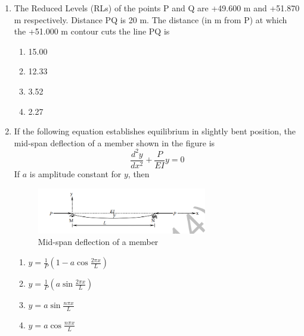 \documentclass[journal,12pt,onecolumn]{IEEEtran}
\theoremstyle{remark}
\begin{document}
\begin{enumerate}
The TRUE statement(s) is(are) \hfill{}

\begin{multicols}{4}
\begin{enumerate}
\item P only
\item Q only
\item P and Q only
\item P and R only
\end{enumerate}
\end{multicols}

\item The Reduced Levels (RLs) of the points P and Q are +49.600 m and +51.870 m respectively. Distance PQ is 20 m. The distance (in m from P) at which the +51.000 m contour cuts the line PQ is \hfill{}

\begin{multicols}{4}
\begin{enumerate}
\item 15.00
\item 12.33
\item 3.52
\item 2.27
\end{enumerate}
\end{multicols}



\item If the following equation establishes equilibrium in slightly bent position, the mid-span deflection of a member shown in the figure is
\[
\frac{d^2 y}{dx^2} + \frac{P}{EI} y = 0
\]
If \(a\) is amplitude constant for \(y\), then \hfill{}

\begin{figure}[H]
    \centering
    \includegraphics[width=0.7\textwidth]{figs/image7.png}
    \caption{Mid-span deflection of a member}
    \label{fig:q26}
\end{figure}

\begin{multicols}{4}
\begin{enumerate}
\item \( y = \frac{1}{P} \left(1 - a \cos \frac{2 \pi x}{L} \right) \)
\item \( y = \frac{1}{P} \left(a \sin \frac{2 \pi x}{L} \right) \)
\item \( y = a \sin \frac{n \pi x}{L} \)
\item \( y = a \cos \frac{n \pi x}{L} \)
\end{enumerate}
\end{multicols}


\end{enumerate}
\end{document}
